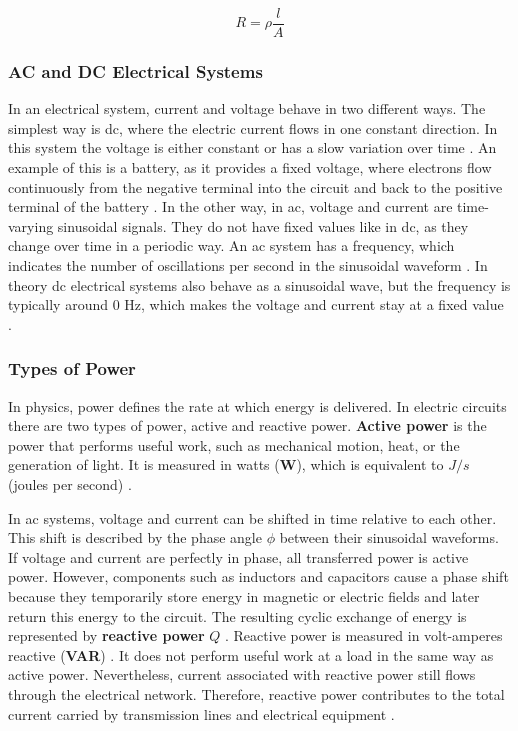\begin{equation}\label{eq:resistance}
    R = \rho\frac{l}{A}
\end{equation}

\subsubsection{AC and DC Electrical Systems}
In an electrical system, current and voltage behave in two different ways. The simplest way is \ac{dc}, where the electric current flows in one constant direction. In this system the voltage is either constant or has a slow variation over time \cite{fundamentals_e_circuits}. An example of this is a battery, as it provides a fixed voltage, where electrons flow continuously from the negative terminal into the circuit and back to the positive terminal of the battery \cite{distributed_power_generation}. In the other way, in \ac{ac}, voltage and current are time-varying sinusoidal signals. They do not have fixed values like in \ac{dc}, as they change over time in a periodic way. An \ac{ac} system has a frequency, which indicates the number of oscillations per second in the sinusoidal waveform \cite{fundamentals_e_circuits}. In theory \ac{dc} electrical systems also behave as a sinusoidal wave, but the frequency is typically around 0 Hz, which makes the voltage and current stay at a fixed value \cite{fundamentals_e_circuits}.

\subsubsection{Types of Power}
In physics, power defines the rate at which energy is delivered. In electric circuits there are two types of power, active and reactive power. 
\textbf{Active power} is the power that performs useful work, such as mechanical motion, heat, or the generation of light. It is measured in watts (\textbf{W}), which is equivalent to $J/s$ (joules per second) \cite{fundamentals_circuit_analysis}.

In \ac{ac} systems, voltage and current can be shifted in time relative to each other. This shift is described by the phase angle $\phi$ between their sinusoidal waveforms. If voltage and current are perfectly in phase, all transferred power is active power. However, components such as inductors and capacitors cause a phase shift because they temporarily store energy in magnetic or electric fields and later return this energy to the circuit. The resulting cyclic exchange of energy is represented by \textbf{reactive power} $Q$ \cite{fundamentals_e_circuits,power_sys_analysis}. Reactive power is measured in volt-amperes reactive (\textbf{VAR}) \cite{power_sys_analysis}. It does not perform useful work at a load in the same way as active power. Nevertheless, current associated with reactive power still flows through the electrical network. Therefore, reactive power contributes to the total current carried by transmission lines and electrical equipment \cite{power_sys_analysis}.

